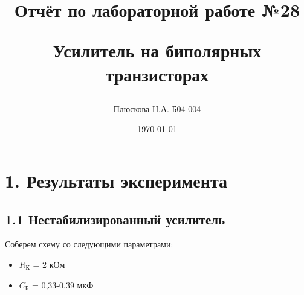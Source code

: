 \documentclass[a4paper,12pt]{report}
\title{Отчёт по лабораторной работе №28

Усилитель на биполярных транзисторах}
\author{Плюскова Н.А. Б04-004 }
\date{\today}
\begin{document}
\maketitle

\section*{1. Результаты эксперимента}
\subsection*{1.1 Нестабилизированный усилитель}

Соберем схему со следующими параметрами:
\begin{itemize}
    \item $R_{\text{К}}$ = 2 кОм
    \item $C_{\text{Б}}$ = 0,33-0,39 мкФ
\end{itemize}
\end{document}
